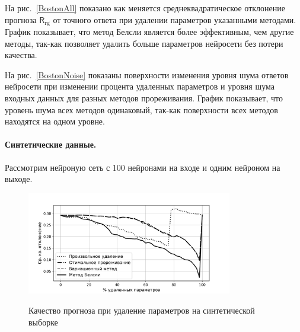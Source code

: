 На рис.~\ref{BostonAll} показано как меняется среднеквадратическое отклонение прогноза $\mathsf{R}_{\text{rg}}$ от точного ответа  при удалении параметров указанными методами. График показывает, что метод Белсли является более эффективным, чем другие методы, так-как позволяет удалить больше параметров нейросети без потери качества.

На рис.~\ref{BostonNoise} показаны поверхности изменения уровня шума ответов нейросети при изменении процента удаленных параметров и уровня шума входных данных для разных методов прореживания. График показывает, что уровень шума всех методов одинаковый, так-как поверхности всех методов находятся на одном уровне.


\paragraph{Синтетические данные.} Рассмотрим нейроную сеть с 100 нейронами на входе и одним нейроном на выходе.

\begin{figure}[h!t]\center
\includegraphics[width=0.8\textwidth]{results/relevant/Data1/All.pdf}\\
\caption{Качество прогноза при удаление параметров на синтетической выборке}
\label{Data1All}
\end{figure}

